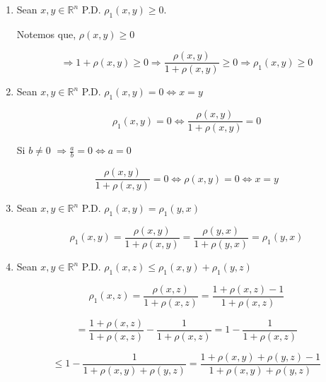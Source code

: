 \begin{proofexplanation}
\begin{enumerate}[label=(\subscript{D}{{\arabic*}})]
\item  Sean $x,y \in \mathbb{R}^{n}$ P.D. ${\rho}_{1}(x,y) \geqslant 0$. 
        
Notemos que, ${\rho}(x,y) \geqslant 0$

\begin{equation*}
     \Rightarrow 1+{\rho}(x,y) \geqslant 0
    \Rightarrow \frac{{\rho}(x,y)}{1+{\rho}(x,y)} \geqslant 0    \Rightarrow {\rho}_{1}(x,y) \geqslant 0
\end{equation*}

\item  Sean $x,y \in \mathbb{R}^{n}$ P.D. ${\rho}_{1}(x,y)=0 \Leftrightarrow x=y$

\begin{equation*}
    {\rho}_{1}(x,y)=0 \Leftrightarrow \frac{{\rho}(x,y)}{1+{\rho}(x,y)} = 0
\end{equation*}

    Si $b \neq 0$ $\Rightarrow \frac{a}{b}=0 \Leftrightarrow a = 0$

\begin{equation*}
    \frac{{\rho}(x,y)}{1+{\rho}(x,y)} = 0 \Leftrightarrow {\rho}(x,y) = 0 \Leftrightarrow x = y
\end{equation*}

\item  Sean $x,y \in \mathbb{R}^{n}$ P.D. ${\rho}_{1}(x,y)={\rho}_{1}(y,x)$

\begin{equation*}
    {\rho}_{1}(x,y)= \frac{{\rho}(x,y)}{1+{\rho}(x,y)}=\frac{{\rho}(y,x)}{1+{\rho}(y,x)}= {\rho}_{1}(y,x)
\end{equation*}

\item  Sean $x,y \in \mathbb{R}^{n}$ P.D. ${\rho}_{1}(x,z) \leqslant {\rho}_{1}(x,y) +{\rho}_{1}(y,z)$

\begin{equation*}
    {\rho}_{1}(x,z) =\frac{{\rho}(x,z)}{1+{\rho}(x,z)} = \frac{1+{\rho}(x,z)-1}{1+{\rho}(x,z)}
\end{equation*}

\begin{equation*}
    = \frac{1+{\rho}(x,z)}{1+{\rho}(x,z)}-\frac{1}{1+{\rho}(x,z)}=1-\frac{1}{1+{\rho}(x,z)}
\end{equation*}

\begin{equation*}
    \leqslant 1-\frac{1}{1+{\rho}(x,y)+{\rho}(y,z)}=\frac{1+{\rho}(x,y)+{\rho}(y,z)-1}{1+{\rho}(x,y)+{\rho}(y,z)}
\end{equation*}


\end{enumerate}
\end{proofexplanation}
